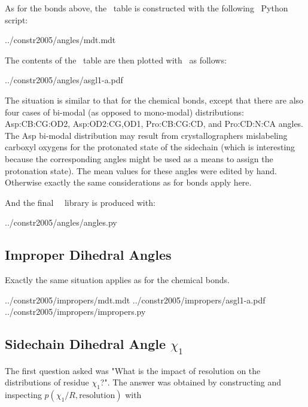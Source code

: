 As for the bonds above, the \MDT\ table is constructed with the following
\MDT\ Python script:

           {../constr2005/angles/mdt.mdt}

The contents of the \MDT\ table are then plotted with \ASGL\ as follows:

           {../constr2005/angles/asgl1-a.pdf}


The situation is similar to that for the chemical bonds, except that there are also four cases of bi-modal
(as opposed to mono-modal) distributions: Asp:CB:CG:OD2, Asp:OD2:CG,OD1, Pro:CB:CG:CD, and Pro:CD:N:CA 
angles. The Asp bi-modal distribution may result from crystallographers mislabeling carboxyl oxygens for 
the protonated state of the sidechain (which is interesting because the corresponding angles might 
be used as a means to assign the protonation state). The mean values for these angles were edited by 
hand. Otherwise exactly the same considerations as for bonds apply here.

And the final \MODELLER\ \MDT\ library is produced with:

           {../constr2005/angles/angles.py}


\subsection{Improper Dihedral Angles}

Exactly the same situation applies as for the chemical bonds.

           {../constr2005/impropers/mdt.mdt}
           {../constr2005/impropers/asgl1-a.pdf}
           {../constr2005/impropers/impropers.py}


\subsection{Sidechain Dihedral Angle $\chi_1$}

The first question asked was "What is the impact of resolution on the distributions of residue $\chi_1$?". The answer
was obtained by constructing and inspecting $p(\chi_1 / R, \mbox{resolution})$ with

